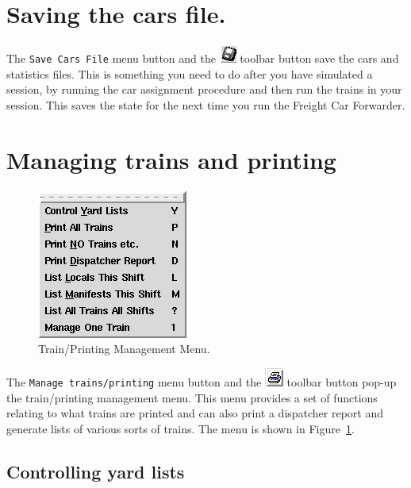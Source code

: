 \section{Saving the cars file.}

The \verb=Save Cars File= menu button and the \includegraphics{FCFSaveCarsTool.png} 
toolbar button save the cars and statistics files. This is something you
need to do after you have simulated a session, by running the car
assignment procedure and then run the trains in your session.  This
saves the state for the next time you run the Freight Car Forwarder.

\section{Managing trains and printing}
\begin{figure}[hbpt]
\begin{centering}
\includegraphics{FCFManageTrainsMenu.png}
\caption{Train/Printing Management Menu.}
\label{fig:fcf:FCFManageTrainsMenu}
\end{centering}
\end{figure}
The \verb=Manage trains/printing= menu button and the 
\includegraphics{FCFManageTrainsTool.png} toolbar button pop-up the
train/printing management menu.  This menu provides a set of functions
relating to what trains are printed and can also  print a dispatcher
report and generate lists of various sorts of trains.  The menu is shown
in  Figure~\ref{fig:fcf:FCFManageTrainsMenu}.

\subsection{Controlling yard lists}


